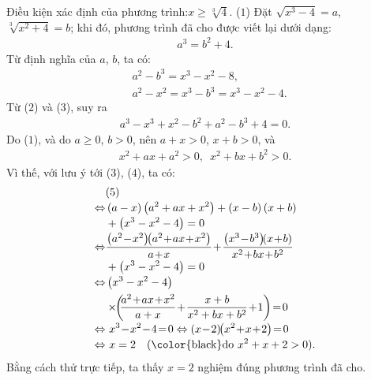\begin{multicols}{2}
	\vskip 0.05cm
	Điều kiện xác định của phương trình:\linebreak $x \ge \sqrt[3]{4}$. \hfill ($1$)
	\vskip 0.05cm
	Đặt $\sqrt {{x^3} - 4}  = a$,   $\sqrt[3]{{{x^2} + 4}} = b$; khi đó, phương trình đã cho được viết lại dưới dạng:
	\begin{align*}
		{a^3} = {b^2} + 4. \tag{$2$}
	\end{align*}
	Từ định nghĩa của $a$, $b$, ta có:
	\begin{align*}
		&{a^2} - {b^3} = {x^3} - {x^2} - 8, \tag{$3$}\\
		&{a^2} - {x^2} = {x^3} - {b^3} = {x^3} - {x^2} - 4.\tag{$4$}
	\end{align*}
	Từ ($2$) và ($3$), suy ra
	\begin{align*}
		{a^3} - {x^3} + {x^2} - {b^2} + {a^2} - {b^3} + 4 = 0. \tag{$5$}
	\end{align*}
	Do ($1$), và do $a \ge 0$, $b > 0$, nên $a + x > 0$, $x + b > 0$, và
	\begin{align*}
		{x^2} + ax + {a^2} > 0,\,\,\, {x^2} + bx + {b^2} > 0.
	\end{align*}
	Vì thế, với lưu ý tới ($3$), ($4$), ta có:
	\begin{align*}
		&(5) \\[-0.5ex]
		\Leftrightarrow &\left( {a - x} \right)\left( {{a^2} + ax + {x^2}} \right) + \left( {x - b} \right)\left( {x + b} \right) \\[-0.5ex]
		&+ \left( {{x^3} - {x^2} - 4} \right) = 0\\[-0.5ex]
		\Leftrightarrow &\frac{{\left( {{a^2} \!-\! {x^2}} \right)\!\!\left( {{a^2} \!+\! ax \!+\! {x^2}} \right)}}{{a \!+\! x}} \!+\! \frac{{\left( {{x^3} \!-\! {b^3}} \right)\!\!\left( {x \!+\! b} \right)}}{{{x^2} \!+\! bx \!+\! {b^2}}} \\[-0.5ex]
		&+ \left( {{x^3} - {x^2} - 4} \right) = 0\\[-0.5ex]
		\Leftrightarrow &\left( {{x^3} - {x^2} - 4} \right)\\
		&\times\!\!\left(\!\! {\frac{{{a^2} \!+\! ax \!+\! {x^2}}}{{a + x}} \!+\! \frac{{x + b}}{{{x^2} + bx + {b^2}}} \!+\! 1} \right) \!=\! 0\\[-0.5ex]
		\Leftrightarrow &\,\,{x^3} \!-\! {x^2} \!-\! 4 \!=\! 0 \Leftrightarrow  \left( {x \!-\! 2} \right)\!\!\left( {{x^2} \!+\! x \!+\! 2} \right) \!=\! 0\\[-0.5ex]
		\Leftrightarrow &\,\,x = 2 \quad(\text{\color{black}do } x^2 + x + 2 > 0).
	\end{align*}
	Bằng cách thử trực tiếp, ta thấy $x = 2$ nghiệm đúng phương trình đã cho.

\end{multicols}

